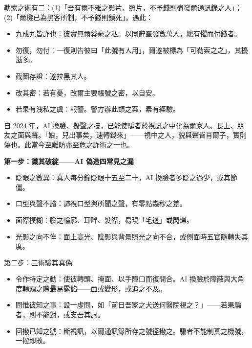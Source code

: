 
勒索之術有二：(1)「吾有爾不雅之影片、照片，不予錢則盡發爾通訊錄之人」；(2)「爾機已為黑客所制，不予錢則鎖死」。遇此：

\begin{itemize}
  \item 九成九皆詐也：彼實無爾絲毫之私。以同辭羣發數萬人，總有懼而付錢者。
  \item 勿復，勿付：一復則告彼曰「此號有人用」，爾遂被標為「可勒索之之」，其擾滋多。
  \item 截圖存證：遂拉黑其人。
  \item 改其密：若有憂，改爾主要帳號之密，以自安。
  \item 若果有洩私之虞：報警。警方辦此類之案，素有經驗。
\end{itemize}


自 2024 年，AI 換臉、擬聲之技，已能使騙者於視訊之中化為爾家人、長上、朋友之面與聲。「娘，兒出事矣，速轉錢來」——視中之人，貌與聲皆肖爾子，實則偽也。此當今至難防亦至危之詐術之一也。

\textbf{第一步：識其破綻——AI 偽造四常見之漏}\par

\begin{itemize}
  \item 眨眼之數異：真人每分鐘眨眼十五至二十，AI 換臉者多眨之過少，或其節僵。
  \item 口型與聲不諧：諦視口型與所聞之聲，有零點幾秒之差。
  \item 面際模糊：臉之輪廓、耳畔、髮際，易現「毛邊」或閃爍。
  \item 光影之向不侔：面上高光、陰影與背景照光之向不合，或側面時五官隨轉失其度。
\end{itemize}

\begin{tcbinfo}{第二步：三術驗其真偽}
\begin{itemize}
  \item 令作特定之動：使彼轉頭、掩面、以手障口而復開合。AI 換臉於障蔽與大角度轉頭之際最易露餡——面或變形，或追之不及。
  \item 問惟彼知之事：設一虛問，如「前日吾家之犬送何醫院視之？」——若果騙者，則不能對，或支吾其詞。
  \item 回撥已知之號：斷視訊，以爾通訊錄所存之號徑撥之。騙者不能制真之機號，一撥即敗。
\end{itemize}

\end{tcbinfo}

